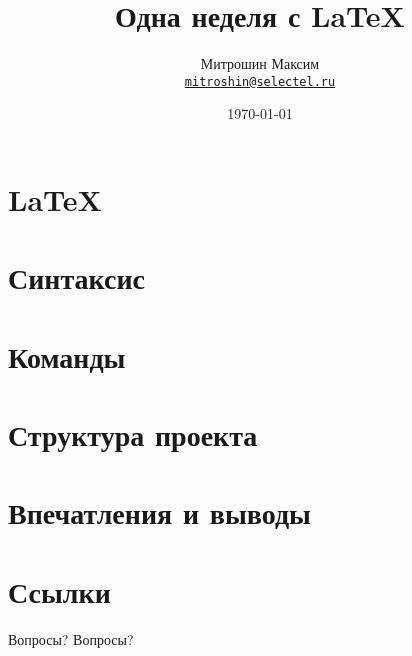 \documentclass[10pt]{beamer}
\title{Одна неделя с \LaTeX}
\author[Митрошин Максим]{Митрошин Максим \\ \texttt{\href{mailto:mitroshin@selectel.ru}{mitroshin@selectel.ru}}}
\date{\today}
\institute{Selectel}
\begin{document}
\begin{frame}
\titlepage
\end{frame}

\section{\LaTeX}


\section{Синтаксис}


\section{Команды}



\section{Структура проекта}

% 
% 

\section{Впечатления и выводы}


\section{Ссылки}


\begin{frame}{Вопросы?}
  Вопросы?
\end{frame}
\end{document}

